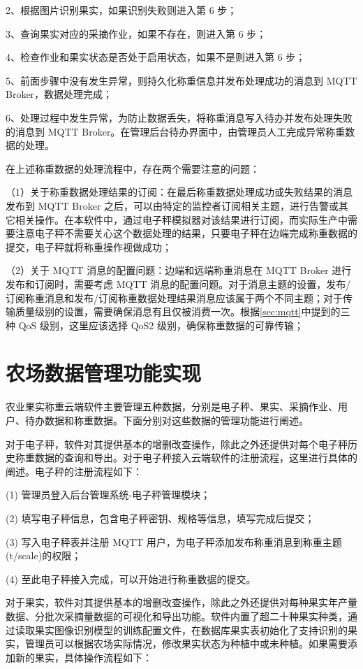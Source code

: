 2、根据图片识别果实，如果识别失败则进入第 6 步；

3、查询果实对应的采摘作业，如果不存在，则进入第 6 步；

4、检查作业和果实状态是否处于启用状态，如果不是则进入第 6 步；

5、前面步骤中没有发生异常，则持久化称重信息并发布处理成功的消息到 MQTT Broker，数据处理完成；

6、处理过程中发生异常，为防止数据丢失，将称重消息写入待办并发布处理失败的消息到 MQTT Broker。在管理后台待办界面中，由管理员人工完成异常称重数据的处理。

在上述称重数据的处理流程中，存在两个需要注意的问题：

（1）关于称重数据处理结果的订阅：在最后称重数据处理成功或失败结果的消息发布到 MQTT Broker 之后，可以由特定的监控者订阅相关主题，进行告警或其它相关操作。在本软件中，通过电子秤模拟器对该结果进行订阅，而实际生产中需要注意电子秤不需要关心这个数据处理的结果，只要电子秤在边端完成称重数据的提交，电子秤就将称重操作视做成功；

（2）关于 MQTT 消息的配置问题：边端和远端称重消息在 MQTT Broker 进行发布和订阅时，需要考虑 MQTT 消息的配置问题。对于消息主题的设置，发布/订阅称重消息和发布/订阅称重数据处理结果消息应该属于两个不同主题；对于传输质量级别的设置，需要确保消息有且仅被消费一次。根据\ref{sec:mqtt}中提到的三种 QoS 级别，这里应该选择 QoS2 级别，确保称重数据的可靠传输；

\section{农场数据管理功能实现}\label{data-management}

农业果实称重云端软件主要管理五种数据，分别是电子秤、果实、采摘作业、用户、待办数据和称重数据。下面分别对这些数据的管理功能进行阐述。

对于电子秤，软件对其提供基本的增删改查操作，除此之外还提供对每个电子秤历史称重数据的查询和导出。对于电子秤接入云端软件的注册流程，这里进行具体的阐述。电子秤的注册流程如下：

(1) 管理员登入后台管理系统-电子秤管理模块；

(2) 填写电子秤信息，包含电子秤密钥、规格等信息，填写完成后提交；

(3) 写入电子秤表并注册 MQTT 用户，为电子秤添加发布称重消息到称重主题(t/scale)的权限；

(4) 至此电子秤接入完成，可以开始进行称重数据的提交。

对于果实，软件对其提供基本的增删改查操作，除此之外还提供对每种果实年产量数据、分批次采摘量数据的可视化和导出功能。软件内置了超二十种果实种类，通过读取果实图像识别模型的训练配置文件，在数据库果实表初始化了支持识别的果实，管理员可以根据农场实际情况，修改果实状态为种植中或未种植。如果需要添加新的果实，具体操作流程如下：

